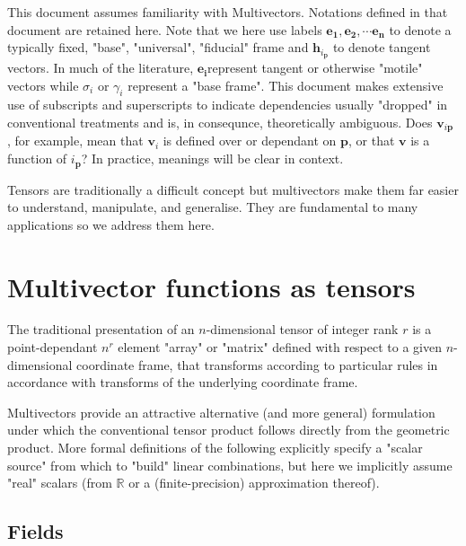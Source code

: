 \documentclass[a4paper]{book}
\numberwithin{equation}{chapter}
\begin{document}
\vspace{\baselineskip}

This document assumes familiarity with Multivectors. Notations defined in that document are 
retained here. Note that we here use labels $\mathbf{e_1,e_2,\cdots e_n}$
to denote a typically fixed, "base", "universal", "fiducial" frame 
and $\mathbf{h}_{i_\mathbf{p}}$ to denote tangent vectors. In much of the literature,
$\mathbf{e_i}$represent tangent or otherwise "motile" vectors while 
$\sigma_i$ or $\gamma_i$ represent a "base frame".
This document makes extensive use of subscripts and superscripts to indicate dependencies 
usually "dropped" in conventional treatments and is, in consequnce, theoretically ambiguous. 
Does $\mathbf{v}_{i\mathbf{p}}$ , for example, mean that $\mathbf{v}_i$ 
is defined over or dependant on $\mathbf{p}$, 
or that $\mathbf{v}$ is a function of $i_{\mathbf{p}}$? 
In practice, meanings will be clear in context.

\vspace{\baselineskip}

Tensors are traditionally a difficult concept but multivectors make them far easier to
understand, manipulate, and generalise. They are fundamental to many applications so we
address them here.


\section{Multivector functions as tensors}

The traditional presentation of an $n$-dimensional tensor of integer rank $r$ is 
a point-dependant $n^r$ element "array" or "matrix" defined with respect to a given 
$n$-dimensional coordinate frame, that transforms according to particular rules in 
accordance with transforms of the underlying coordinate frame. 

\vspace{\baselineskip}

Multivectors provide an attractive alternative (and more general) formulation under which the
conventional tensor product follows directly from the geometric product. More formal 
definitions of the following explicitly specify a "scalar source" from which to "build" linear combinations, but here we implicitly assume "real" scalars (from $\mathbb{R}$ or a 
(finite-precision) approximation thereof). 

\subsection{Fields}
\end{document}
